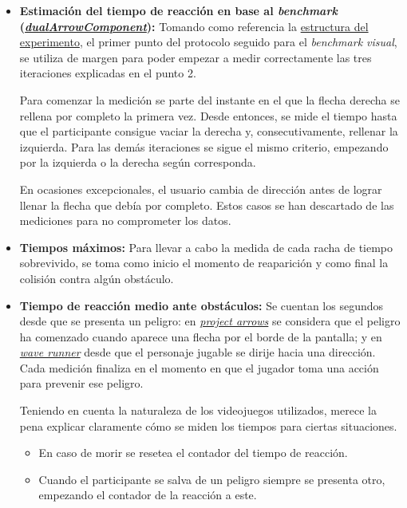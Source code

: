 \begin{itemize}
      \item \textbf{Estimación del tiempo de reacción en base al \textit{benchmark} (\hyperref[subsec:benchmark_visual]{\textit{dualArrowComponent}}):} Tomando como referencia la \hyperref[sec:rt_estructura]{estructura del experimento}, el primer punto del protocolo seguido para el \textit{benchmark visual}, se utiliza de margen para poder empezar a medir correctamente las tres iteraciones explicadas en el punto 2.

            Para comenzar la medición se parte del instante en el que la flecha derecha se
            rellena por completo la primera vez. Desde entonces, se mide el tiempo hasta
            que el participante consigue vaciar la derecha y, consecutivamente, rellenar la
            izquierda. Para las demás iteraciones se sigue el mismo criterio, empezando por
            la izquierda o la derecha según corresponda.

            En ocasiones excepcionales, el usuario cambia de dirección antes de lograr
            llenar la flecha que debía por completo. Estos casos se han descartado de las
            mediciones para no comprometer los datos.

      \item \textbf{Tiempos máximos:} Para llevar a cabo la medida de cada racha de tiempo sobrevivido, se toma como inicio el momento de reaparición y como final la colisión contra algún obstáculo.

      \item \textbf{Tiempo de reacción medio ante obstáculos:} Se cuentan los segundos desde que se presenta un peligro: en \hyperref[subsec:project_arrows]{\textit{project arrows}} se considera que el peligro ha comenzado cuando aparece una flecha por el borde de la pantalla; y en \hyperref[subsec:endless_wave_runner]{\textit{wave runner}} desde que el personaje jugable se dirije hacia una dirección. Cada medición finaliza en el momento en que el jugador toma una acción para prevenir ese peligro.

            Teniendo en cuenta la naturaleza de los videojuegos utilizados, merece la pena
            explicar claramente cómo se miden los tiempos para ciertas situaciones.
            \begin{itemize}
                  \item En caso de morir se resetea el contador del tiempo de reacción.

                  \item Cuando el participante se salva de un peligro siempre se presenta otro,
                        empezando el contador de la reacción a este.


\end{itemize}
\end{itemize}
